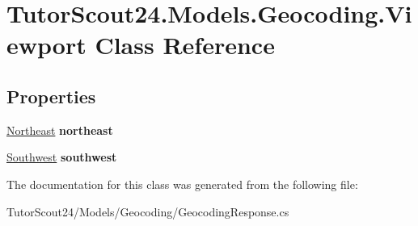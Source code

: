 \hypertarget{class_tutor_scout24_1_1_models_1_1_geocoding_1_1_viewport}{}\section{Tutor\+Scout24.\+Models.\+Geocoding.\+Viewport Class Reference}
\label{class_tutor_scout24_1_1_models_1_1_geocoding_1_1_viewport}
\subsection*{Properties}
\begin{DoxyCompactItemize}
\item 
\mbox{\label{class_tutor_scout24_1_1_models_1_1_geocoding_1_1_viewport_a017b0f688de249dbf9b624751e9ad05f}} 
\mbox{\hyperlink{class_tutor_scout24_1_1_models_1_1_geocoding_1_1_northeast}{Northeast}} {\bfseries northeast}
\item 
\mbox{\label{class_tutor_scout24_1_1_models_1_1_geocoding_1_1_viewport_ad90e0b7f9056754cf181923cfd335c8e}} 
\mbox{\hyperlink{class_tutor_scout24_1_1_models_1_1_geocoding_1_1_southwest}{Southwest}} {\bfseries southwest}
\end{DoxyCompactItemize}


The documentation for this class was generated from the following file\+:\begin{DoxyCompactItemize}
\item 
Tutor\+Scout24/\+Models/\+Geocoding/Geocoding\+Response.\+cs\end{DoxyCompactItemize}
